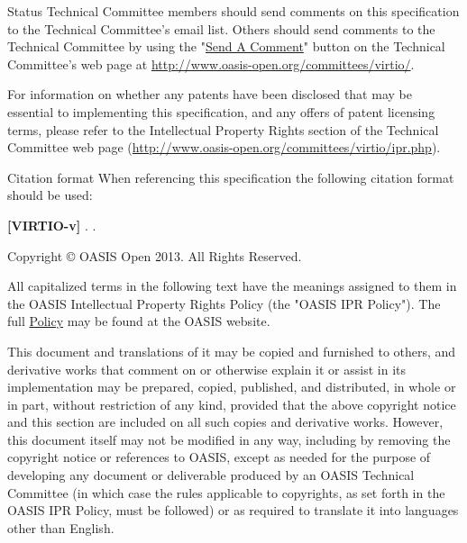 \begin{titlepage}
\begin{oasistitlesection}{Status}
Technical Committee members should send comments on this specification to the Technical Committee’s email list. Others should send comments to the Technical Committee by using the "\href{http://www.oasis-open.org/committees/comments/form.php?wg_abbrev=virtio}{Send A Comment}" button on the Technical Committee’s web page at \url{http://www.oasis-open.org/committees/virtio/}.

For information on whether any patents have been disclosed that may be essential to implementing this specification, and any offers of patent licensing terms, please refer to the Intellectual Property Rights section of the Technical Committee web page (\url{http://www.oasis-open.org/committees/virtio/ipr.php}).
\end{oasistitlesection}


\begin{oasistitlesection}{Citation format}
When referencing this specification the following citation format should be used:\newline

\textbf{[VIRTIO-v\virtiorev]}\newline
\textit{\virtioversion}. \virtioworkingdraftdate.
\virtiodraftoasisstagename \virtiodraftstageextra\virtiourlhtml
\end{oasistitlesection}

\vfill\newpage


Copyright © OASIS Open 2013. All Rights Reserved.

All capitalized terms in the following text have the meanings assigned
to them in the OASIS Intellectual Property Rights Policy (the "OASIS
IPR Policy"). The full \href{https://www.oasis-open.org/policies-guidelines/ipr}{Policy} may be found at the OASIS website.

This document and translations of it may be copied and furnished to
others, and derivative works that comment on or otherwise explain it
or assist in its implementation may be prepared, copied, published,
and distributed, in whole or in part, without restriction of any kind,
provided that the above copyright notice and this section are included
on all such copies and derivative works. However, this document itself
may not be modified in any way, including by removing the copyright
notice or references to OASIS, except as needed for the purpose of
developing any document or deliverable produced by an OASIS Technical
Committee (in which case the rules applicable to copyrights, as set
forth in the OASIS IPR Policy, must be followed) or as required to
translate it into languages other than English.


\end{titlepage}
